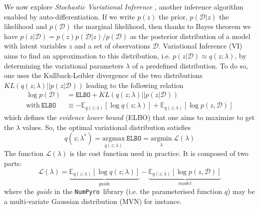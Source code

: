 \documentclass[twocolumn,twocolappendix,nofootinbib,iop]{openjournal}
\newcommand{\numpyro}{\texttt{NumPyro}}
\begin{document}
We now explore \textit{Stochastic Variational Inference} \citep{10.5555/2567709.2502622, 8588399}, another inference algorithm enabled by auto-differentiation. If we  write $p(z)$ the prior, $p(\mathcal{D}|z)$ the likelihood and $p(\mathcal{D})$ the marginal likelihood, then thanks to Bayes theorem we have $p(z|\mathcal{D})=p(z)p(\mathcal{D}|z)/p(\mathcal{D})$ as the posterior distribution of a model with latent variables $z$ and a set of observations $\mathcal{D}$. Variational Inference (VI) aims to find an approximation to this distribution, i.e. $p(z|\mathcal{D}) \approx q(z;\lambda)$, by determining the variational parameters $\lambda$ of a predefined distribution. To do so, one uses the Kullback-Leibler divergence of the two distributions $KL(q(z;\lambda)||p(z|\mathcal{D}))$ leading to the following relation
\begin{align}
\log p(\mathcal{D}) &= \mathtt{ELBO} +  KL(q(z;\lambda)||p(z|\mathcal{D})) \label{eq-ELBO} \\
\mathrm{with} \ \mathtt{ELBO} &\equiv -\mathbb{E}_{q(z;\lambda)}\left[ \log q(z;\lambda)\right] + \mathbb{E}_{q(z;\lambda)}\left[ \log p(z,\mathcal{D}) \right] 
\end{align}
which defines the \textit{evidence lower bound} (ELBO) that one aims to maximize to get the $\lambda$ values. So, the optimal variational distribution satisfies
\begin{equation}
q(z;\lambda^\ast) = \underset{q(z;\lambda)}{\mathrm{argmax}}\  \mathtt{ELBO} = 
\underset{\lambda}{\mathrm{argmin}}\ \mathcal{L}(\lambda)
\end{equation}
The function $\mathcal{L}(\lambda)$ is the cost function used in practice. It is composed of two parts:
\begin{equation}
\mathcal{L}(\lambda) = \underbrace{\mathbb{E}_{q(z;\lambda)}\left[ \log q(z;\lambda)\right]}_{guide} - \underbrace{\mathbb{E}_{q(z;\lambda)}\left[ \log p(z,\mathcal{D}) \right]}_{model}
\label{eq-loss-svi-1}
\end{equation}
where the \textit{guide} in the \numpyro\ library (i.e. the parameterised function $q$) may be a multi-variate Gaussian distribution (MVN) for instance.
\end{document}
